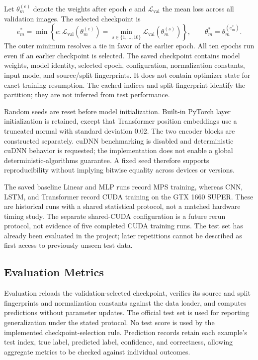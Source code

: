 Let $\theta_m^{(e)}$ denote the weights after epoch $e$ and
$\mathcal{L}_{\mathrm{val}}$ the mean loss across all validation images.
The selected checkpoint is
\begin{equation}
 e_m^*=\min\!\left\{e:\mathcal{L}_{\mathrm{val}}(\theta_m^{(e)})
     =\min_{s\in\{1,\ldots,10\}}
       \mathcal{L}_{\mathrm{val}}(\theta_m^{(s)})\right\},\qquad
 \theta_m^*=\theta_m^{(e_m^*)}.
 \label{eq:meth_selection}
\end{equation}
The outer minimum resolves a tie in favor of the earlier epoch. All ten
epochs run even if an earlier checkpoint is selected. The saved checkpoint
contains model weights, model identity, selected epoch, configuration,
normalization constants, input mode, and source/split fingerprints. It does
not contain optimizer state for exact training resumption. The cached indices
and split fingerprint identify the partition; they are not inferred from
test performance.

Random seeds are reset before model initialization. Built-in PyTorch layer
initialization is retained, except that Transformer position embeddings use
a truncated normal with standard deviation 0.02. The two encoder blocks are
constructed separately. cuDNN benchmarking is disabled and deterministic
cuDNN behavior is requested; the implementation does not enable a global
deterministic-algorithms guarantee. A fixed seed therefore supports
reproducibility without implying bitwise equality across devices or versions.

The saved baseline Linear and MLP runs record MPS training, whereas CNN,
LSTM, and Transformer record CUDA training on the GTX 1660 SUPER. These are
historical runs with a shared statistical protocol, not a matched hardware
timing study. The separate shared-CUDA configuration is a future rerun
protocol, not evidence of five completed CUDA training runs. The test set has
already been evaluated in the project; later repetitions cannot be described
as first access to previously unseen test data.

\clearpage
\subsection{Evaluation Metrics}
\label{sec:meth_metrics}
Evaluation reloads the validation-selected checkpoint, verifies its source
and split fingerprints and normalization constants against the data loader,
and computes predictions without parameter updates. The official test set
is used for reporting generalization under the stated protocol. No test score
is used by the implemented checkpoint-selection rule. Prediction records
retain each example's test index, true label, predicted label, confidence,
and correctness, allowing aggregate metrics to be checked against individual
outcomes.

